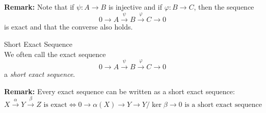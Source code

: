 \noindent\textbf{Remark:} Note that if $\psi: A\to B$ is injective and if $\varphi: B\to C$, then the sequence
$$0 \to A \overset{\psi}{\to} B \overset{\varphi}{\to} C \to 0$$
is exact and that the converse also holds.

\begin{definition}{Short Exact Sequence}\\
We often call the exact sequence
$$0 \to A \overset{\psi}{\to} B \overset{\varphi}{\to} C \to 0$$
a \textit{short exact sequence}.
\end{definition}

\noindent\textbf{Remark:} Every exact sequence can be written as a short exact sequence:
\[
X \overset{\alpha}{\to} Y \overset{\beta}{\to} Z \text{ is exact} \Leftrightarrow 0 \to \alpha(X) \to Y \to Y/\ker \beta \to 0 \text{ is a short exact sequence}
\]

